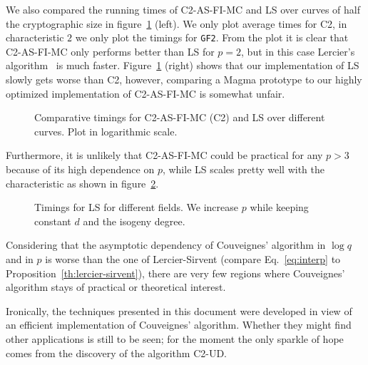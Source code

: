 We also compared the running times of C2-AS-FI-MC and LS over curves
of half the cryptographic size in figure~\ref{fig:comp} (left). We
only plot average times for C2, in characteristic $2$ we only plot the
timings for \texttt{GF2}. From the plot it is clear that C2-AS-FI-MC
only performs better than LS for $p=2$, but in this case Lercier's
algorithm~\cite{lercier96} is much faster.  Figure~\ref{fig:comp}
(right) shows that our implementation of LS slowly gets worse than C2,
however, comparing a Magma prototype to our highly optimized
implementation of C2-AS-FI-MC is somewhat unfair.

\begin{figure}
  \centering
   \caption{Comparative timings for C2-AS-FI-MC (C2) and LS over
     different curves. Plot in logarithmic scale.}
  \label{fig:comp}
\end{figure}

Furthermore, it is unlikely that C2-AS-FI-MC could be
practical for any $p>3$ because of its high dependence on $p$, while
LS scales pretty well with the characteristic as shown in
figure~\ref{fig:LSp}.

\begin{figure}
  \centering
  \caption{Timings for LS for different fields. We increase $p$ while
    keeping constant $d$ and the isogeny degree.}
  \label{fig:LSp}
\end{figure}

Considering that the asymptotic dependency of Couveignes' algorithm in
$\log q$ and in $p$ is worse than the one of Lercier-Sirvent (compare
Eq.~\eqref{eq:interp} to Proposition~\ref{th:lercier-sirvent}), there
are very few regions where Couveignes' algorithm stays of practical or
theoretical interest.

Ironically, the techniques presented in this document were developed
in view of an efficient implementation of Couveignes'
algorithm. Whether they might find other applications is still to be
seen; for the moment the only sparkle of hope comes from the discovery
of the algorithm C2-UD.


%
